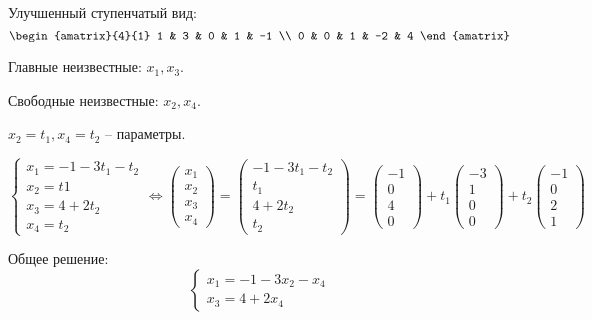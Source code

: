\begin{example}
    Улучшенный ступенчатый вид:
    \begin{equation*}
        \begin{amatrix}{4}{1}
            1 & 3 & 0 & 1 & -1 \\
            0 & 0 & 1 & -2 & 4
        \end{amatrix}
    \end{equation*}

    Главные неизвестные: $x_1, x_3$.

    Свободные неизвестные: $x_2, x_4$.

    $x_2 = t_1, x_4 = t_2$ -- параметры.

    \begin{equation*}
        \begin{cases}
            x_1 = -1 - 3t_1 - t_2 \\
            x_2 = t1 \\
            x_3 = 4 + 2t_2 \\
            x_4 = t_2
        \end{cases}
        \iff
        \begin{pmatrix} x_1 \\ x_2 \\ x_3 \\ x_4 \end{pmatrix}
        =
        \begin{pmatrix} -1 - 3t_1 - t_2 \\ t_1 \\ 4 + 2t_2 \\ t_2 \end{pmatrix}
        =
        \begin{pmatrix} -1 \\ 0 \\ 4 \\ 0 \end{pmatrix}
        +
        t_1
        \begin{pmatrix} -3 \\ 1 \\ 0 \\ 0 \end{pmatrix}
        +
        t_2
        \begin{pmatrix} -1 \\ 0 \\ 2 \\ 1 \end{pmatrix}
    \end{equation*}

    Общее решение:
    \begin{equation*}
        \begin{cases}
            x_1 = -1 - 3x_2 - x_4 \\
            x_3 = 4 + 2x_4
        \end{cases}
    \end{equation*}
\end{example}

